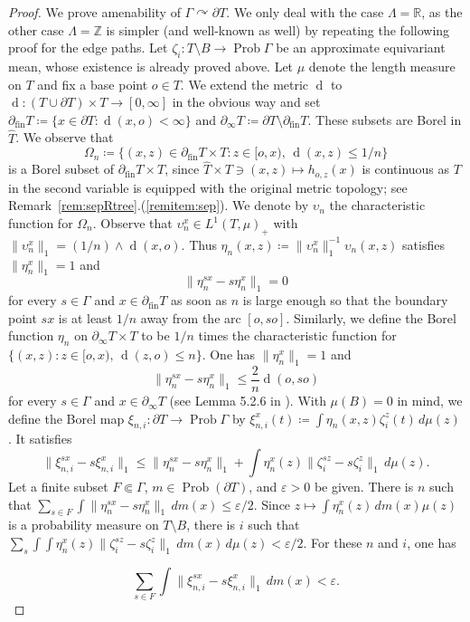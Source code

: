 \documentclass[12pt,nosumlimits,nonamelimits]{amsart}
\theoremstyle{remark}
\theoremstyle{definition}
\newcommand{\IR}{\mathbb{R}}
\newcommand{\IZ}{\mathbb{Z}}
\newcommand{\ve}{\varepsilon}
\newcommand{\Ga}{\Gamma}
\newcommand{\La}{\Lambda}
\newcommand{\acts}{\curvearrowright}
\newcommand{\fin}{\mathrm{fin}}
\DeclareMathOperator{\Prob}{Prob}
\DeclareMathOperator{\dist}{d}
\begin{document}
\begin{proof}
We prove amenability of  $\Ga\acts \partial T$. 
We only deal with the case $\La=\IR$, 
as the other case $\La=\IZ$ is 
simpler (and well-known as well) 
by repeating the following proof 
for the edge paths. 
Let $\zeta_i\colon T\setminus B \to \Prob \Ga$ 
be an approximate equivariant mean, 
whose existence is already proved above. 
Let $\mu$ denote the length measure on $T$ 
and fix a base point $o\in T$. 
We extend the metric $\dist$ to $\dist\colon (T\cup\partial T)\times T\to[0,\infty]$ 
in the obvious way and set 
$\partial_\fin T\coloneq\{ x\in\partial T :  \dist(x,o) < \infty\}$ 
and $\partial_\infty T\coloneq \partial T\setminus\partial_\fin T$.
These subsets are Borel in $\hat{T}$. 
We observe that 
\[
\Omega_n \coloneq \{ (x,z) \in \partial_\fin T \times T 
 : z\in[o,x),\,\dist(x,z)\le 1/n\}
\] 
is a Borel subset of $\partial_\fin T \times T$, 
since $\hat{T} \times T \ni (x,z) \mapsto h_{o,z}(x)$ 
is continuous as $T$ in the second variable 
is equipped with the original metric topology; 
see Remark~\ref{rem:sepRtree}.(\ref{remitem:sep}). 
We denote by $\upsilon_n$ the characteristic 
function for $\Omega_n$. 
Observe that $\upsilon_n^x \in L^1(T,\mu)_+$ with 
$\|\upsilon_n^x\|_1 = (1/n)\wedge\dist(x,o)$. 
Thus $\eta_n(x,z) \coloneq \|\upsilon_n^x\|_1^{-1}\upsilon_n(x,z)$ 
satisfies $\|\eta_n^x\|_1=1$ 
and 
\[
\| \eta_n^{sx} - s\eta_n^x \|_1 = 0
\]
for every $s\in\Ga$ and $x\in\partial_\fin T$ 
as soon as $n$ is large enough so that 
the boundary point $sx$ is at least $1/n$ 
away from the arc $[o,so]$. 
Similarly, we define the Borel function 
$\eta_n$ on $\partial_\infty T \times T$ to be 
$1/n$ times the characteristic function for 
$\{ (x,z) : z\in[o,x),\,\dist(z,o)\le n\}$. 
One has $\|\eta_n^x\|_1=1$ and
\[
\| \eta_n^{sx} - s\eta_n^x \|_1 \le \frac{2}{n}\dist(o,so)
\]
for every $s\in\Ga$ and $x\in\partial_\infty T$ (see Lemma 5.2.6 in \cite{bo}).
With $\mu(B)=0$ in mind, we define the Borel map 
$\xi_{n,i}\colon \partial T\to\Prob \Ga$ by 
$\xi_{n,i}^x (t) \coloneq \int \eta_n(x,z)\zeta_i^z(t)\,d\mu(z)$.
It satisfies 
\[
\| \xi_{n,i}^{sx} - s\xi_{n,i}^x \|_1
 \le \| \eta_n^{sx} - s\eta_n^x \|_1 + \int \eta_n^x(z)\|\zeta_i^{sz} - s\zeta_i^z\|_1\,d\mu(z).
\]
Let a finite subset $F\Subset\Ga$, $m\in\Prob(\partial T)$, and $\ve>0$ be given.
There is $n$ such that 
$\sum_{s\in F}\int \| \eta_n^{sx} - s\eta_n^x \|_1 \,dm(x)\le \ve/2$. 
Since $z\mapsto\int\eta_n^x(z)\,dm(x)\mu(z)$ is a probability 
measure on  $T\setminus B$, 
there is $i$ such that 
$\sum_s\int\int\eta_n^x(z)
\|\zeta_i^{sz} - s\zeta_i^z\|_1\,dm(x)\,d\mu(z)<\ve/2$.
For these $n$ and $i$, one has \\
\begin{minipage}{.9\textwidth}
\[
\sum_{s\in F} \int \| \xi_{n,i}^{sx} - s\xi_{n,i}^x \|_1\,dm(x)<\ve.
\]
\end{minipage}
\end{proof}
%
%
\end{document}
